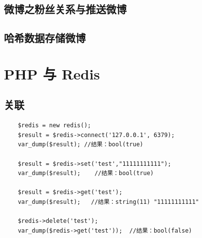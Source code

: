\documentclass[UTF8,a4paper,12pt]{ctexbook}
\begin{document}
	\section{微博之粉丝关系与推送微博}
	
	\section{哈希数据存储微博}



\chapter{PHP 与 Redis}
	\section{关联}
		\begin{lstlisting}
	$redis = new redis();  
	$result = $redis->connect('127.0.0.1', 6379);  
	var_dump($result); //结果：bool(true)  
	
	$result = $redis->set('test',"11111111111");  
	var_dump($result);    //结果：bool(true)  
	
	$result = $redis->get('test');  
	var_dump($result);   //结果：string(11) "11111111111"  
	
	$redis->delete('test');  
	var_dump($redis->get('test'));  //结果：bool(false)  
		\end{lstlisting}		    
\end{document}

